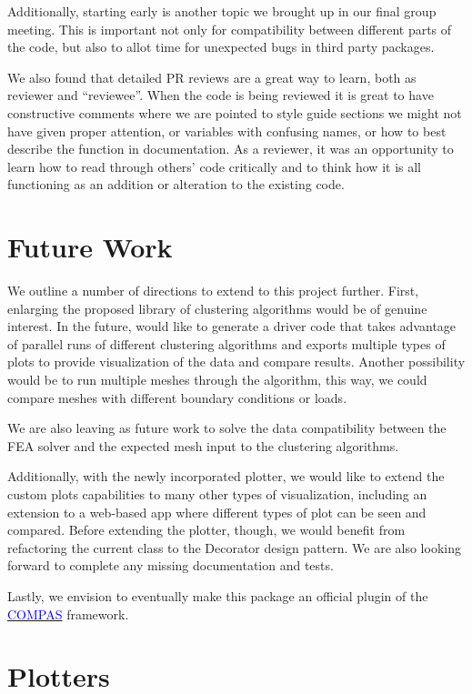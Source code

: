 \documentclass[11pt]{article}
\begin{document}
Additionally, starting early is another topic we brought up in our final group meeting. This is important not only for compatibility between different parts of the code, but also to allot time for unexpected bugs in third party packages.

We also found that detailed PR reviews are a great way to learn, both as reviewer and “reviewee”. When the code is being reviewed it is great to have constructive comments where we are pointed to style guide sections we might not have given proper attention, or variables with confusing names, or how to best describe the function in documentation. As a reviewer, it was an opportunity to learn how to read through others’ code critically and to think how it is all functioning as an addition or alteration to the existing code.


\section{Future Work}

We outline a number of directions to extend to this project further. First, enlarging the proposed library of clustering algorithms would be of genuine interest. In the future, would like to generate a driver code that takes advantage of parallel runs of different clustering algorithms and exports multiple types of plots to provide visualization of the data and compare results. Another possibility would be to run multiple meshes through the algorithm, this way, we could compare meshes with different boundary conditions or loads.

We are also leaving as future work to solve the data compatibility between the FEA solver and the expected mesh input to the clustering algorithms. 

Additionally, with the newly incorporated plotter, we would like to extend the custom plots capabilities to many other types of visualization, including an extension to a web-based app where different types of plot can be seen and compared.
Before extending the plotter, though, we would benefit from refactoring the current class to the Decorator design pattern. 
We are also looking forward to complete any missing documentation and tests.

Lastly, we envision to eventually make this package an official plugin of the \href{http://www.compas.dev}{\textcolor{blue}{COMPAS}} framework.


\clearpage
\appendix

\section{Plotters}
\label{appendix:a}

\end{document}
